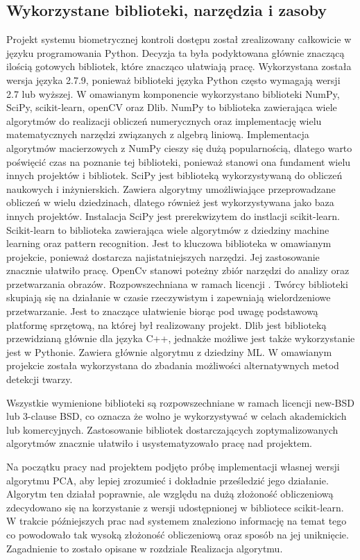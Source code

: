 \documentclass[oneside, eng]{mgr}
\begin{document}
\subsection{Wykorzystane biblioteki, narzędzia i zasoby}
Projekt systemu biometrycznej kontroli dostępu został zrealizowany całkowicie w języku programowania Python. Decyzja ta była podyktowana głównie znaczącą ilością gotowych bibliotek, które znacząco ułatwiają pracę. Wykorzystana została wersja języka 2.7.9, ponieważ biblioteki języka Python często wymagają wersji 2.7 lub wyższej. W omawianym komponencie wykorzystano biblioteki NumPy, SciPy, scikit-learn, openCV oraz Dlib. 
NumPy to biblioteka zawierająca wiele algorytmów do realizacji obliczeń numerycznych oraz implementację wielu matematycznych narzędzi związanych z algebrą liniową. Implementacja algorytmów macierzowych z NumPy cieszy się dużą popularnością, dlatego warto poświęcić czas na poznanie tej biblioteki, ponieważ stanowi ona fundament wielu innych projektów i bibliotek.
SciPy jest biblioteką wykorzystywaną do obliczeń naukowych i inżynierskich. Zawiera algorytmy umożliwiające przeprowadzane obliczeń w wielu dziedzinach, dlatego również jest wykorzystywana jako baza innych projektów.
Instalacja SciPy jest prerekwizytem do instlacji scikit-learn. Scikit-learn to biblioteka zawierająca wiele algorytmów z dziedziny machine learning oraz pattern recognition. Jest to kluczowa biblioteka w omawianym projekcie, ponieważ dostarcza najistatniejszych narzędzi. Jej zastosowanie znacznie ułatwiło pracę.
OpenCv stanowi poteżny zbiór narzędzi do analizy oraz przetwarzania obrazów. Rozpowszechniana w ramach licencji . Twórcy biblioteki skupiają się na działanie w czasie rzeczywistym i zapewniają wielordzeniowe przetwarzanie. Jest to znaczące ułatwienie biorąc pod uwagę podstawową platformę sprzętową, na której był realizowany projekt. 
Dlib jest biblioteką przewidzianą głównie dla języka C++, jednakże możliwe jest także wykorzystanie jest w Pythonie. Zawiera głównie algorytmu z dziedziny ML. W omawianym projekcie została wykorzystana do zbadania możliwości alternatywnych metod detekcji twarzy.

Wszystkie wymienione biblioteki są rozpowszechniane w ramach licencji new-BSD lub 3-clause BSD, co oznacza że wolno je wykorzystywać w celach akademickich lub komercyjnych. Zastosowanie bibliotek dostarczających zoptymalizowanych algorytmów znacznie ułatwiło i usystematyzowało pracę nad projektem.

Na początku pracy nad projektem podjęto próbę implementacji własnej wersji algorytmu PCA, aby lepiej zrozumieć i dokładnie prześledzić jego działanie. Algorytm ten działał poprawnie, ale względu na dużą złożoność obliczeniową zdecydowano się na korzystanie z wersji udostępnionej w bibliotece scikit-learn. W trakcie późniejszych prac nad systemem znaleziono informację na temat tego co powodowało tak wysoką złożoność obliczeniową oraz sposób na jej uniknięcie. Zagadnienie to zostało opisane w rozdziale Realizacja algorytmu.
\end{document}
